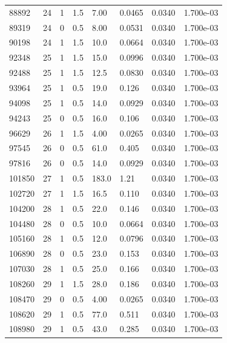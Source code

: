 \documentclass[preview]{standalone}
\begin{document}
{{{{\begin{tabular}{L{1.2cm}C{1.2cm} C{0.3cm}C{0.5cm} C{1.4cm}C{1.4cm} C{1.4cm}C{1.4cm}}
  88892  &    24  & 1     & 1.5 &  7.00  & 0.0465  & 0.0340 &  1.700e-03   \\ 
  89319  &    24  & 0     & 0.5 &  8.00  & 0.0531  & 0.0340 &  1.700e-03   \\ 
  90198  &    24  & 1     & 1.5 &  10.0  & 0.0664  & 0.0340 &  1.700e-03   \\ 
  92348  &    25  & 1     & 1.5 &  15.0  & 0.0996  & 0.0340 &  1.700e-03   \\ 
  92488  &    25  & 1     & 1.5 &  12.5  & 0.0830  & 0.0340 &  1.700e-03   \\ 
  93964  &    25  & 1     & 0.5 &  19.0  & 0.126  & 0.0340 &  1.700e-03   \\ 
  94098  &    25  & 1     & 0.5 &  14.0  & 0.0929  & 0.0340 &  1.700e-03   \\ 
  94243  &    25  & 0     & 0.5 &  16.0  & 0.106  & 0.0340 &  1.700e-03   \\ 
  96629  &    26  & 1     & 1.5 &  4.00  & 0.0265  & 0.0340 &  1.700e-03   \\ 
  97545  &    26  & 0     & 0.5 &  61.0  & 0.405  & 0.0340 &  1.700e-03   \\ 
  97816  &    26  & 0     & 0.5 &  14.0  & 0.0929  & 0.0340 &  1.700e-03   \\ 
  101850  &    27  & 1     & 0.5 &  183.0  & 1.21  & 0.0340 &  1.700e-03   \\ 
  102720  &    27  & 1     & 1.5 &  16.5  & 0.110  & 0.0340 &  1.700e-03   \\ 
  104200  &    28  & 1     & 0.5 &  22.0  & 0.146  & 0.0340 &  1.700e-03   \\ 
  104480  &    28  & 0     & 0.5 &  10.0  & 0.0664  & 0.0340 &  1.700e-03   \\ 
  105160  &    28  & 1     & 0.5 &  12.0  & 0.0796  & 0.0340 &  1.700e-03   \\ 
  106890  &    28  & 0     & 0.5 &  23.0  & 0.153  & 0.0340 &  1.700e-03   \\ 
  107030  &    28  & 1     & 0.5 &  25.0  & 0.166  & 0.0340 &  1.700e-03   \\ 
  108260  &    29  & 1     & 1.5 &  28.0  & 0.186  & 0.0340 &  1.700e-03   \\ 
  108470  &    29  & 0     & 0.5 &  4.00  & 0.0265  & 0.0340 &  1.700e-03   \\ 
  108620  &    29  & 1     & 0.5 &  77.0  & 0.511  & 0.0340 &  1.700e-03   \\ 
  108980  &    29  & 1     & 0.5 &  43.0  & 0.285  & 0.0340 &  1.700e-03   \\ 

\end{tabular}}}}}
\end{document}
